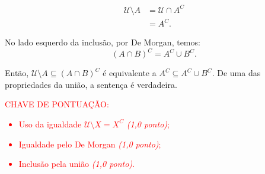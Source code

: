 \begin{align*}
    \mathcal{U} \setminus A & = \mathcal{U} \cap A^{C} \\
    & = A^{C}.
\end{align*}

No lado esquerdo da inclusão, por De Morgan, temos:
$$(A \cap B)^{C} = A^{C} \cup B^{C}.$$

Então,  $ \mathcal{U} \setminus A \subseteq (A \cap B)^{C}$ é equivalente a $A^{C} \subseteq A^{C} \cup B^{C}$. De uma das propriedades da união, a sentença é verdadeira.

\bigskip








\bigskip

\textcolor{red}{CHAVE DE PONTUAÇÃO:
\begin{itemize}
    \item  Uso da igualdade $\mathcal{U} \setminus X= X^{C}$ \emph{(1,0 ponto)};
    \item  Igualdade pelo De Morgan \emph{(1,0 ponto)};
    \item  Inclusão pela união \emph{(1,0 ponto)}.
\end{itemize} }